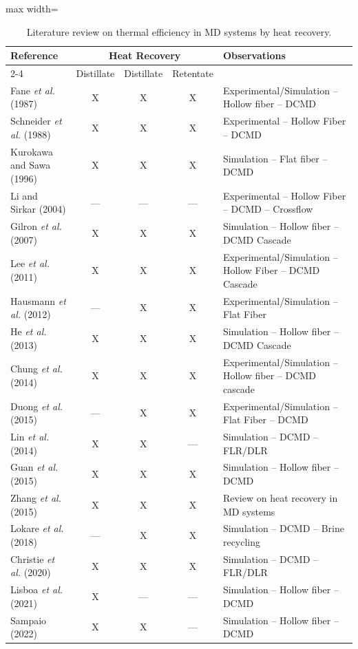 \documentclass[14pt,letterpaper,fleqn]{extarticle}
\renewcommand{\textbf}[1]{#1}
\begin{document}
\begin{table}[!h]
\centering
\caption{Literature review on thermal efficiency in MD systems by heat recovery.}
\label{tab:litreview}
\begin{adjustbox}{max width=\textwidth}
\begin{tabular}{lcccp{7cm}}
\toprule
\multirow{2}{*}{\textbf{Reference}} & \multicolumn{3}{c}{\textbf{Heat Recovery}} & \multirow{2}{*}{\textbf{Observations}} \\
\cmidrule{2-4}
 & \textbf{Distillate} & \textbf{Distillate} & \textbf{Retentate} & \\
\midrule
Fane \textit{et al.} (1987) & X & X & X & Experimental/Simulation -- Hollow fiber -- DCMD \\
Schneider \textit{et al.} (1988) & X & X & X & Experimental -- Hollow Fiber -- DCMD \\
Kurokawa and Sawa (1996) & X & X & X & Simulation -- Flat fiber -- DCMD \\
Li and Sirkar (2004) & --- & --- & --- & Experimental -- Hollow Fiber -- DCMD -- Crossflow \\
Gilron \textit{et al.} (2007) & X & X & X & Simulation -- Hollow fiber -- DCMD Cascade \\
Lee \textit{et al.} (2011) & X & X & X & Experimental/Simulation -- Hollow Fiber -- DCMD Cascade \\
Hausmann \textit{et al.} (2012) & --- & X & X & Experimental/Simulation -- Flat Fiber \\
He \textit{et al.} (2013) & X & X & X & Simulation -- Hollow fiber -- DCMD Cascade \\
Chung \textit{et al.} (2014) & X & X & X & Experimental/Simulation -- Hollow fiber -- DCMD cascade \\
Duong \textit{et al.} (2015) & --- & X & X & Experimental/Simulation -- Flat Fiber -- DCMD \\
Lin \textit{et al.} (2014) & X & X & --- & Simulation -- DCMD -- FLR/DLR \\
Guan \textit{et al.} (2015) & X & X & X & Simulation -- Hollow fiber -- DCMD \\
Zhang \textit{et al.} (2015) & X & X & X & Review on heat recovery in MD systems \\
Lokare \textit{et al.} (2018) & --- & X & X & Simulation -- DCMD -- Brine recycling \\
Christie \textit{et al.} (2020) & X & X & X & Simulation -- DCMD -- FLR/DLR \\
Lisboa \textit{et al.} (2021) & X & --- & --- & Simulation -- Hollow fiber -- DCMD \\
Sampaio (2022) & X & X & --- & Simulation -- Hollow fiber -- DCMD \\
\bottomrule
\end{tabular}
\end{adjustbox}
\end{table}
\end{document}
